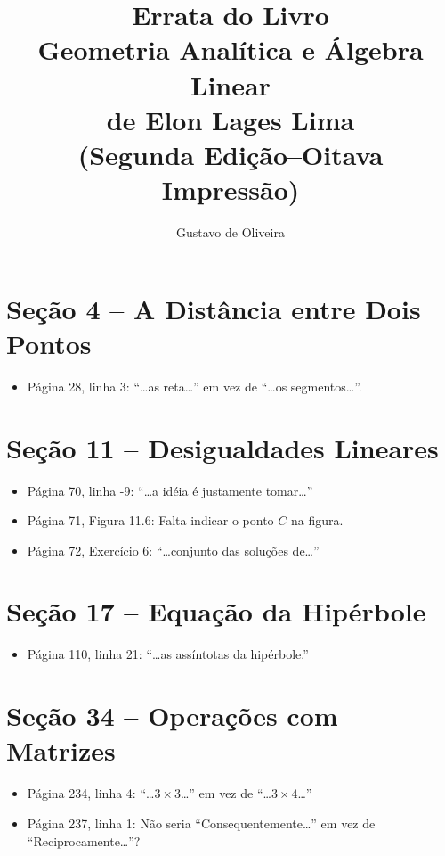 \documentclass[a4paper,11pt]{article}
\title{Errata do Livro\\Geometria Analítica e Álgebra Linear\\de Elon Lages Lima\\(Segunda Edição--Oitava Impressão)}
\author{Gustavo de Oliveira}
\begin{document}
\maketitle

\section*{Seção 4 -- A Distância entre Dois Pontos}

\begin{itemize}
  \item
    Página 28, linha 3: ``\dots as reta\dots'' em vez de ``\dots os segmentos\dots''.
\end{itemize}

\section*{Seção 11 -- Desigualdades Lineares}

\begin{itemize}
  \item
    Página 70, linha -9: ``\dots a idéia é justamente tomar\dots''
  \item
    Página 71, Figura 11.6: Falta indicar o ponto $C$ na figura.
  \item
    Página 72, Exercício 6: ``\dots conjunto das soluções de\dots''
\end{itemize}

\section*{Seção 17 -- Equação da Hipérbole}

\begin{itemize}
  \item
    Página 110, linha 21: ``\dots as assíntotas da hipérbole.''
\end{itemize}

\section*{Seção 34 -- Operações com Matrizes}

\begin{itemize}
  \item
    Página 234, linha 4: ``\dots $3 \times 3$\dots'' em vez de ``\dots $3 \times 4$\dots''
  \item
    Página 237, linha 1: Não seria ``Consequentemente\dots'' em vez de ``Reciprocamente\dots''?
\end{itemize}
\end{document}
